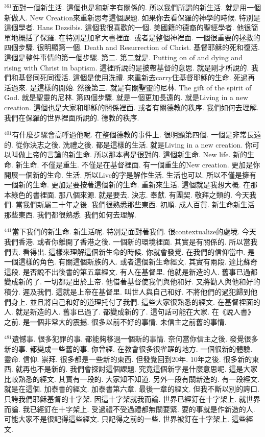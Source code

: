 \documentclass{book}
\begin{document}
$^{361}$面對一個新生活.
這個也是和新字有關係的.
所以我們所謂的新生活.
就是用一個新做人.
New Creation來重新思考這個課題.
如果你去看保羅的神學的時候.
特別是這個學者.
Hans Dezsibis.
這個我很喜歡的一個.
美國籍的德裔的聖經學者.
他很簡單地概括了保羅.
在特別是加拿大書裡面.
或者是整個神裡面.
一個很重要的拯救的四個步驟.
很明顯第一個.
Death and Resurrection of Christ.
基督耶穌的死和復活.
這個是整件事情的第一個步驟.
第二.
第二就是.
Putting on of and dying and rising with Christ in baptism.
這裡所說的是披帶基督的意思.
就是剛才所說的.
我們和基督同死同復活.
這個是使用洗禮.
來重新去carry住基督耶穌的生命.
死過再活過來.
是這樣的開始.
然後第三.
就是有關聖靈的尼林.
The gift of the spirit of God.
就是聖靈的尼林.
第四個步驟.
就是一個更加長遠的.
就是Living in a new creation.
這個也是大家和耶穌的關係裡面.
或者有關德教的秩序.
我們如何去理解.
我們在保羅的世界裡面所說的.
德教的秩序.

$^{401}$有什麼步驟會高呼過他呢.
在整個德教的事件上.
很明顯第四個.
一個是非常長遠的.
從你決志之後.
洗禮之後.
都是這樣的生活.
就是Living in a new creation.
你可以叫做上帝的言論的新生命.
所以那本書是很對的.
這個新生命.
New life.
新的生命.
新生命.
不僅是重生.
不僅是在基督裡面.
有一個重生的New creation.
更加是你開展一個新的生命.
生活.
所以Live的字是解作生活.
生活也可以.
所以不僅是擁有一個新的生命.
更加是要按著這個新的生命.
重新來生活.
這個就是我想大概.
在那本綠色的書裡面.
那八個來源.
就是要去.
決志.
奉獻.
有團契.
敬拜之類的.
今天我們.
當我們新屬二十年之後.
我們很熟悉那些東西.
初順.
成人百貨.
新生命新生活那些東西.
我們都很熟悉.
我們如何去理解.

$^{441}$當下我們的新生命.
新生活呢.
特別是面對著我們.
很contextualize的處境.
今天我們香港.
或者你離開了香港之後.
一個新的環境裡面.
其實是有關係的.
所以當我們去.
看得出.
這樣來理解這個新生命的時候.
你就會發覺.
在我們的信仰當中.
是一個這樣的角色.
有關這個新族的人.
或者這個新生命經文.
其實有兩段.
達比蘇奇這段.
是否說不出後書的第五章經文.
有人在基督里.
他就是新造的人.
舊事已過都變成新的了.
一切都是出於上帝.
他借著基督使我們與他和好.
又將勸人與他和好的積分.
遲及我們.
這就是上帝在基督里.
叫世人與自己和好.
不將他們的過犯歸到他們身上.
並且將自己和好的道理托付了我們.
這些大家很熟悉的經文.
在基督裡面的人.
就是新造的人.
舊事已過了.
都變成新的了.
這句話可能在大家.
在《說人書》之前.
是一個非常大的震撼.
很多以前不好的事情.
未信主之前舊的事情.

$^{481}$遺憾事.
很多犯罪的事.
都能夠移過一個新的事情.
奈何當你信主之後.
發覺很多新的事.
都變成一些舊的事.
你曾經.
在教會很多很雀躍的地方.
一個很新的體驗.
靈命.
信仰.
崇拜.
很多都是一些新的東西.
但發覺回到20年.
10年之後.
很多新的東西.
就再也不是新的.
我們會探討這個課題.
究竟這個新字是什麼意思呢.
這是大家比較熟悉的經文.
其實有一段的.
大家知不知道.
另外一段有關新造的.
有一段經文.
就是在這個.
加泰書的經文.
加泰書第六章.
最後一章的經文.
但我不斷以別的誇口.
只誇我們耶穌基督的十字架.
因這十字架就我而論.
世界已經釘在十字架上.
就世界而論.
我已經釘在十字架上.
受過禮不受過禮都無關要緊.
要的事就是作新造的人.
可能大家不是很記得這些經文.
只記得之前的一些.
世界被釘在十字架上.
這些經文.
\end{document}
